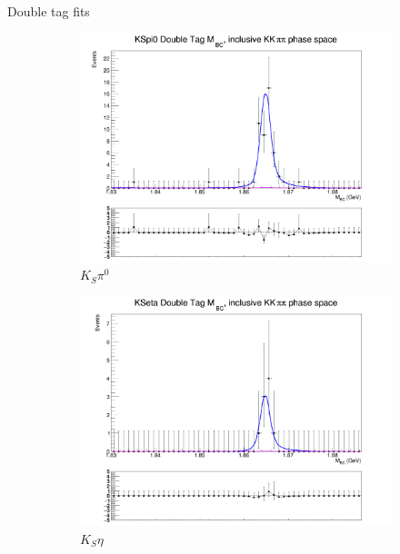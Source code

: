 \documentclass{beamer}
\begin{document}
\begin{frame}{Double tag fits}
  \begin{figure}
    \centering
    \begin{subfigure}{0.33\textwidth}
      \centering
      \includegraphics[width=1.0\textwidth]{Plots/DoubleTagYield_DoubleTag_CP_KKpipi_vs_KSpi0_SignalBin0.png}
      \caption{$K_S\pi^0$}
    \end{subfigure}%
    \begin{subfigure}{0.33\textwidth}
      \centering
      \includegraphics[width=1.0\textwidth]{Plots/DoubleTagYield_DoubleTag_CP_KKpipi_vs_KSeta_SignalBin0.png}
      \caption{$K_S\eta$}
    \end{subfigure}
    \begin{subfigure}{0.33\textwidth}

\end{subfigure}
\end{figure}
\end{frame}
\end{document}
